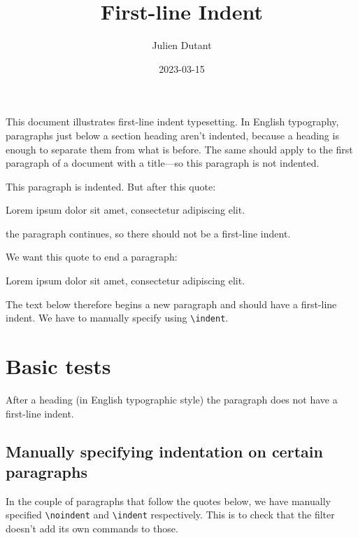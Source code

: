 \documentclass[
  letterpaper,
  DIV=11,
  numbers=noendperiod]{scrartcl}
\title{First-line Indent}
\author{Julien Dutant}
\date{2023-03-15}
\makeatletter
\renewenvironment{quote}
     {\list{}{\listparindent 1.5em%
              \itemindent \listparindent
              \rightmargin \leftmargin
              \parsep \z@ \@plus \p@}%
            \item\noindent\relax}
      {\endlist}
\makeatother
\begin{document}
\maketitle
\ifdefined\Shaded\renewenvironment{Shaded}{\begin{tcolorbox}[enhanced, interior hidden, breakable, frame hidden, sharp corners, borderline west={3pt}{0pt}{shadecolor}, boxrule=0pt]}{\end{tcolorbox}}\fi

\noindent This document illustrates first-line indent typesetting. In
English typography, paragraphs just below a section heading aren't
indented, because a heading is enough to separate them from what is
before. The same should apply to the first paragraph of a document with
a title---so this paragraph is not indented.

This paragraph is indented. But after this quote:

\begin{quote}
\noindent Lorem ipsum dolor sit amet, consectetur adipiscing elit.
\end{quote}

\noindent the paragraph continues, so there should not be a first-line
indent.

We want this quote to end a paragraph:

\begin{quote}
\noindent Lorem ipsum dolor sit amet, consectetur adipiscing elit.
\end{quote}

\indent The text below therefore begins a new paragraph and should have
a first-line indent. We have to manually specify using
\texttt{\textbackslash{}indent}.

\hypertarget{basic-tests}{%
\section{Basic tests}\label{basic-tests}}

After a heading (in English typographic style) the paragraph does not
have a first-line indent.

\hypertarget{manually-specifying-indentation-on-certain-paragraphs}{%
\subsection{Manually specifying indentation on certain
paragraphs}\label{manually-specifying-indentation-on-certain-paragraphs}}

In the couple of paragraphs that follow the quotes below, we have
manually specified \texttt{\textbackslash{}noindent} and
\texttt{\textbackslash{}indent} respectively. This is to check that the
filter doesn't add its own commands to those.
\end{document}
